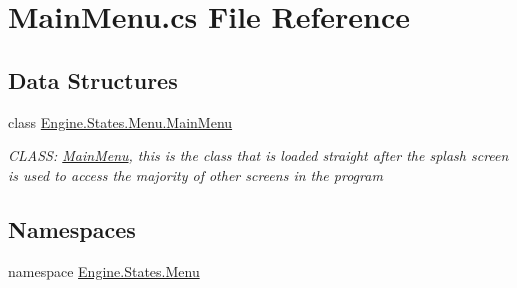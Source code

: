 \hypertarget{a00212}{}\section{Main\+Menu.\+cs File Reference}
\label{a00212}
\subsection*{Data Structures}
\begin{DoxyCompactItemize}
\item 
class \hyperlink{a00574}{Engine.\+States.\+Menu.\+Main\+Menu}
\begin{DoxyCompactList}\small\item\em C\+L\+A\+SS\+: \hyperlink{a00574}{Main\+Menu}, this is the class that is loaded straight after the splash screen is used to access the majority of other screens in the program \end{DoxyCompactList}\end{DoxyCompactItemize}
\subsection*{Namespaces}
\begin{DoxyCompactItemize}
\item 
namespace \hyperlink{a00280}{Engine.\+States.\+Menu}
\end{DoxyCompactItemize}
